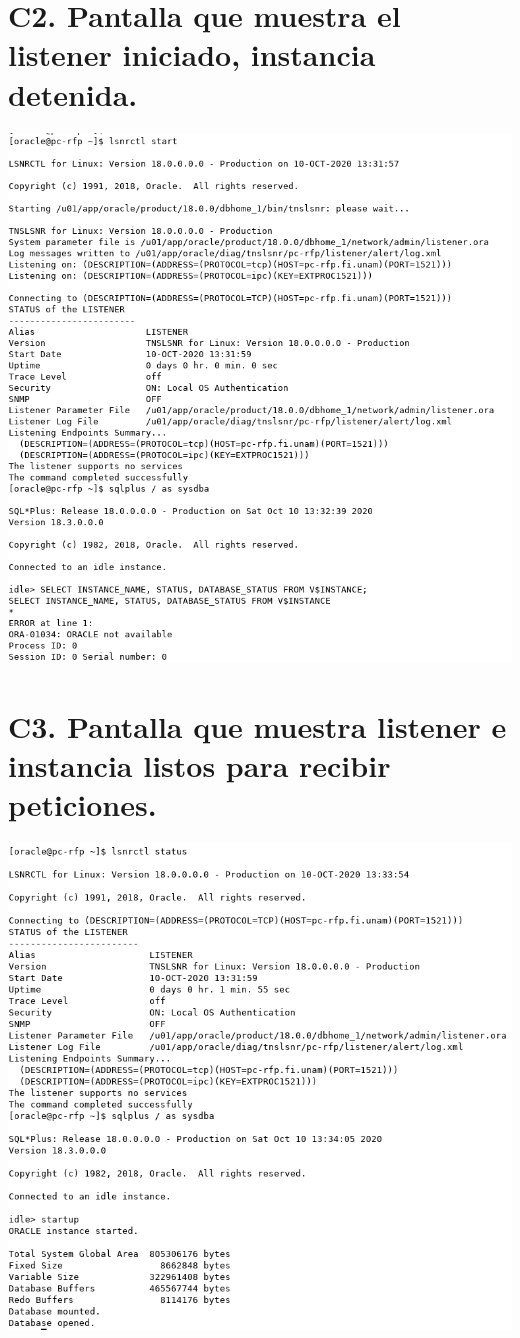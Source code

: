 \documentclass{article}
\begin{document}
\section*{C2. Pantalla que muestra el listener
iniciado, instancia detenida.}

\includegraphics[width=0.8\linewidth]{c2}

\section*{C3. Pantalla que muestra listener e
instancia listos para recibir peticiones.}

\includegraphics[width=0.8\linewidth]{c3}
\end{document}

